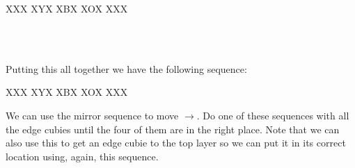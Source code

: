 
\RubikFaceUp XXX XYX XBX
\RubikSliceTopR XOX XXX

\\
\\
\notextcube

Putting this all together we have the following sequence:


\RubikFaceUp XXX XYX XBX
\RubikSliceTopR XOX XXX
\notextcube
{}
\notextcube

We can use the mirror sequence to move $\to$.
Do one of these sequences with all the edge cubies until the four of them are in the right place.
Note that we can also use this to get an edge cubie to the top layer so we can put it in its correct location using, again, this sequence.

